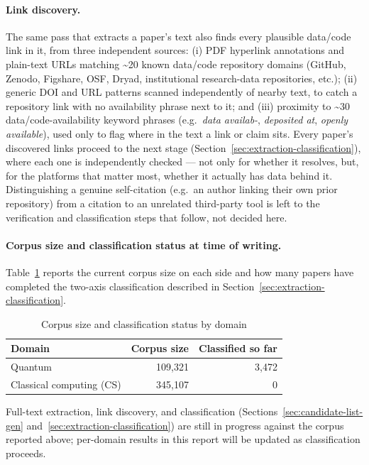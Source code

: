 \paragraph{Link discovery.} The same pass that extracts a paper's text also finds
every plausible data/code link in it, from three independent sources: (i) PDF
hyperlink annotations and plain-text URLs matching \textasciitilde20 known data/code
repository domains (GitHub, Zenodo, Figshare, OSF, Dryad, institutional
research-data repositories, etc.); (ii) generic DOI and URL patterns scanned
independently of nearby text, to catch a repository link with no availability phrase
next to it; and (iii) proximity to \textasciitilde30 data/code-availability keyword
phrases (e.g.\ \emph{data availab-}, \emph{deposited at}, \emph{openly available}),
used only to flag where in the text a link or claim sits. Every paper's discovered
links proceed to the next stage (Section~\ref{sec:extraction-classification}), where
each one is independently checked --- not only for whether it resolves, but, for the
platforms that matter most, whether it actually has data behind it. Distinguishing a
genuine self-citation (e.g.\ an author linking their own prior repository) from a
citation to an unrelated third-party tool is left to the verification and
classification steps that follow, not decided here.

\paragraph{Corpus size and classification status at time of writing.}
\label{sec:corpus-size}

Table~\ref{tab:corpus-stats} reports the current corpus size on each side and how
many papers have completed the two-axis classification described in
Section~\ref{sec:extraction-classification}.

\begin{table}[htbp]
\centering
\caption{Corpus size and classification status by domain}
\label{tab:corpus-stats}
\begin{tabular}{@{}l r r@{}}
\toprule
Domain & Corpus size & Classified so far \\
\midrule
Quantum & 109{,}321 & 3{,}472 \\
Classical computing (CS) & 345{,}107 & 0 \\
\bottomrule
\end{tabular}

\vspace{2mm}
\raggedright\footnotesize
Full-text extraction, link discovery, and classification
(Sections~\ref{sec:candidate-list-gen} and~\ref{sec:extraction-classification}) are
still in progress against the corpus reported above; per-domain results in this
report will be updated as classification proceeds.

\end{table}
